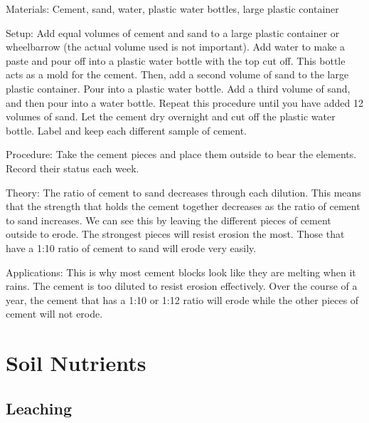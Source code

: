 \begin{multicols}{2}
\begin{description*}
\item[Materials:]{Cement, sand, water, plastic water bottles, large plastic container}
\item[Setup:]{Add equal volumes of cement and sand to a large plastic container or wheelbarrow (the actual volume used is not important). Add water to make a paste and pour off into a plastic water bottle with the top cut off. This bottle acts as a mold for the cement. Then, add a second volume of sand to the large plastic container. Pour into a plastic water bottle. Add a third volume of sand, and then pour into a water bottle. Repeat this procedure until you have added 12 volumes of sand. Let the cement dry overnight and cut off the plastic water bottle. Label and keep each different sample of cement.}
\item[Procedure:]{Take the cement pieces and place them outside to bear the elements. Record their status each week.}
\item[Theory:]{The ratio of cement to sand decreases through each dilution. This means that the strength that holds the cement together decreases as the ratio of cement to sand increases. We can see this by leaving the different pieces of cement outside to erode. The strongest pieces will resist erosion the most. Those that have a 1:10 ratio of cement to sand will erode very easily.}
\item[Applications:]{This is why most cement blocks look like they are melting when it rains. The cement is too diluted to resist erosion effectively. Over the course of a year, the cement that has a 1:10 or 1:12 ratio will erode while the other pieces of cement will not erode.}
\end{description*}



\section*{Soil Nutrients}


\subsection{Leaching}


\end{multicols}
